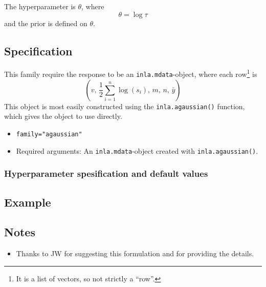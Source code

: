 \documentclass[a4paper,11pt]{article}
\begin{document}
The hyperparameter is $\theta$, where
\begin{displaymath}
    \theta = \log \tau
\end{displaymath}
and the prior is defined on $\theta$.

\subsection*{Specification}

This family require the response to be an \texttt{inla.mdata}-object,
where each row\footnote{It is a list of vectors, so not strictly a
    ``row''.} is
\begin{displaymath}
    (v, \,
    \frac{1}{2}\sum_{i=1}^{n} \log(s_i), \,
    m, \,
    n, \,
    \bar{y})
\end{displaymath}
This object is most easily constructed using the
\texttt{inla.agaussian()} function, which gives the object to use
directly.

\begin{itemize}
\item \texttt{family="agaussian"}
\item Required arguments: An \texttt{inla.mdata}-object created with
    \texttt{inla.agaussian()}.
\end{itemize}

\subsubsection*{Hyperparameter spesification and default values}


\subsection*{Example}



\subsection*{Notes}

\begin{itemize}
\item Thanks to JW for suggesting this formulation and for providing
    the details.
\end{itemize}
\end{document}
